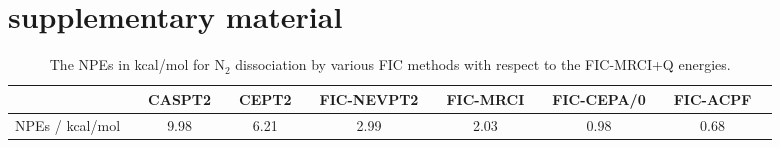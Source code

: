 \documentclass[aip,jcp,amsmath,twocolumn,floatfix,reprint,fleqn]{revtex4-1}
\begin{document}
\section*{supplementary material}

\begin{acknowledgments}  
  
\end{acknowledgments}




\clearpage

{
  \begin{longtable}[!ht]{cccccccccccccc}
  \caption{\label{tab:dissociationN2-NPE}
    The NPEs in kcal/mol for N${}_2$ dissociation by various FIC methods with respect to the FIC-MRCI+Q energies.
  }
\\
\hline
\hline
{}               && CASPT2 && CEPT2 && FIC-NEVPT2 && FIC-MRCI && FIC-CEPA/0 && FIC-ACPF \\
\hline
NPEs  / kcal/mol &&   9.98 &&  6.21 &&       2.99 &&     2.03 &&       0.98 && 0.68 \\
\hline
\hline
\end{longtable}
}

\clearpage
\end{document}
